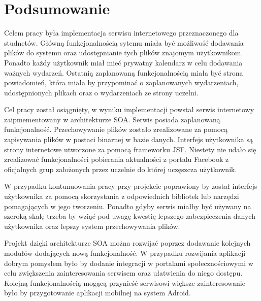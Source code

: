 \chapter{Podsumowanie}
\label{cha:podsumowanie}

Celem pracy była implementacja serwisu internetowego przeznaczonego dla studnetów. Główną funkcjonalnością sytemu miała być możliwość dodawania plików do systemu oraz udostępnianie tych plików znajomym użytkownikom. Ponadto każdy użytkownik miał mieć prywatny kalendarz w celu dodawania ważnych wydarzeń. Ostatnią zaplanowaną funkcjonalnością miała być strona powiadomień, która miała by przypominać o zaplanowanych wydarzeniach, udostępnionych plikach oraz o wydarzeniach ze strony uczelni.

Cel pracy został osiągnięty, w wyniku implementacji powstał serwis internetowy zaipmementowany w architekturze SOA. Serwis posiada zaplanowaną funkcjonalność. Przechowywanie plików zostało zrealizowane za pomocą zapisywania plików w postaci binarnej w bazie danych. Interfejs użytkownika są strony internetowe utworzone za pomocą frameworku JSF. Niestety nie udało się zrealizować funkcjonalności pobierania aktualności z portalu Facebook z oficjalnych grup założonych przez uczelnie do której uczęszcza użytkownik.

W przypadku kontunuowania pracy przy projekcie poprawiony by został interfejs użytkownika za pomocą skorzystania z odpowiednich bibliotek lub narzędzi pomagających w jego tworzeniu. Ponadto gdyby serwis miałby być używany na szeroką skalę trzeba by wziąć pod uwagę kwestię lepszego zabezpieczenia danych użytkownika oraz lepszy system przechowywania plików.

Projekt dzięki architekturze SOA można rozwijać poprzez dodawanie kolejnych modułów dodających nową funkcjonalność. W przypadku rozwijania aplikacji dobrym pomysłem było by dodanie integracji w portalami społecznościowymi w celu zwiększenia zainteresowania serwisem oraz ułatwienia do niego dostępu. Kolejną funkcjonalnością mogącą przynieść serwisowi większe zainteresowanie było by przygotowanie aplikacji mobilnej na system Adroid.

